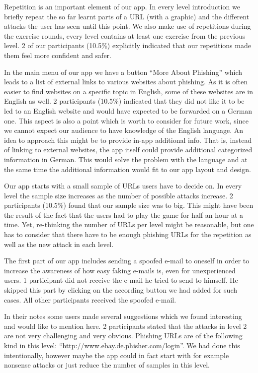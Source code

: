 \begin{description}[leftmargin=0cm]
Repetition is an important element of our app.
In every level introduction we briefly repeat the so far learnt parts of a URL (with a graphic) and the different attacks the user has seen until this point.
We also make use of repetitions during the exercise rounds, every level contains at least one exercise from the previous level.
2 of our participants (10.5\%) explicitly indicated that our repetitions made them feel more confident and safer.
	\item[External Links]
In the main menu of our app we have a button ``More About Phishing'' which leads to a list of external links to various websites about phishing.
As it is often easier to find websites on a specific topic in English, some of these websites are in English as well.
2 participants (10.5\%) indicated that they did not like it to be led to an English website and would have expected to be forwarded on a German one.
This aspect is also a point which is worth to consider for future work, since we cannot expect our audience to have knowledge of the English language.
An idea to approach this might be to provide in-app additional info.
That is, instead of linking to external websites, the app itself could provide additional categorized information in German.
This would solve the problem with the language and at the same time the additional information would fit to our app layout and design.
	\item[Amount of Examples] Our app starts with a small sample of URLs users have to decide on.
In every level the sample size increases as the number of possible attacks increase.
2 participants (10.5\%) found that our sample size was to big.
This might have been the result of the fact that the users had to play the game for half an hour at a time.
Yet, re-thinking the number of URLs per level might be reasonable, but one has to consider that there have to be enough phishing URLs for the repetition as well as the new attack in each level.
	\item[Mail Not Received] The first part of our app includes sending a spoofed e-mail to oneself in order to increase the awareness of how easy faking e-mails is, even for unexperienced users.
1 participant did not receive the e-mail he tried to send to himself.
He skipped this part by clicking on the according button we had added for such cases.
All other participants received the spoofed e-mail.
	\item[Further Suggestions] In their notes some users made several suggestions which we found interesting and would like to mention here.
2 participants stated that the attacks in level 2 are not very challenging and very obvious.
Phishing URLs are of the following kind in this level: ``http://www.ebay.de.phisher.com/login''.
We had done this intentionally, however maybe the app could in fact start with for example nonsense attacks or just reduce the number of samples in this level.


\end{description}
